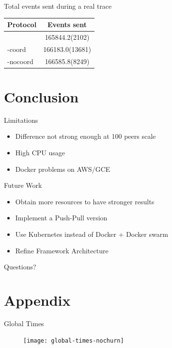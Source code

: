 \begin{frame}{Total events sent during a real trace}
	\begin{table}
		\centering
		\begin{tabular}{lS}
			\toprule
			Protocol & {Events sent}\\
			\midrule
			\epto & 165844.2(2102)\\
			\jgroups-coord & 166183.0(13681)\\
			\jgroups-nocoord & 166585.8(8249)\\
			\bottomrule
		\end{tabular}
	\end{table}
\end{frame}

\section{Conclusion}
\subtitle[Conclusion]{Conclusion}

\begin{frame}{Limitations}
	\begin{itemize}
		\item Difference not strong enough at 100 peers scale
		\item High CPU usage
		\item Docker problems on AWS/GCE
	\end{itemize}
\end{frame}

\begin{frame}{Future Work}
    \begin{itemize}
        \item Obtain more resources to have stronger results
        \item Implement a Push-Pull \epto{} version
        \item Use Kubernetes instead of Docker + Docker swarm
        \item Refine Framework Architecture
    \end{itemize}
\end{frame}

\begin{frame}[standout]
	Questions?
\end{frame}
\section{Appendix}
\subtitle[Appendix]{Appendix}
\begin{frame}{Global Times}
	\begin{figure}
		\texttt{[image: global-times-nochurn]}
	\end{figure}
\end{frame}

